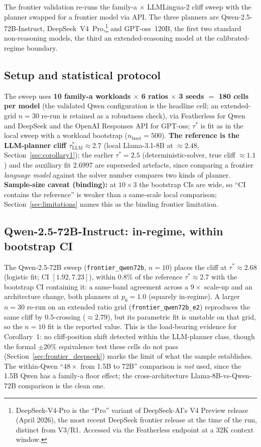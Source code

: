 The frontier validation re-runs the family-a $\times$ LLMLingua-2
cliff sweep with the planner swapped for a frontier model via API.
The three planners are Qwen-2.5-72B-Instruct,
DeepSeek~V4~Pro,\footnote{DeepSeek-V4-Pro is the ``Pro'' variant of
DeepSeek-AI's V4 Preview release (April 2026), the most recent
DeepSeek frontier release at the time of the run, distinct from
V3/R1. Accessed via the Featherless endpoint at a $32$K context
window.} and
GPT-oss~120B, the first two standard non-reasoning models, the third
an extended-reasoning model at the calibrated-regime boundary.

\subsection{Setup and statistical protocol}

The sweep uses \textbf{10 family-a workloads $\times$ 6 ratios
$\times$ 3 seeds $=$ 180 cells per model} (the validated Qwen
configuration is the headline cell; an extended-grid $n=30$ re-run is
retained as a robustness check), via Featherless for Qwen and DeepSeek
and the OpenAI Responses API for GPT-oss; $\tau^{*}$ is fit as in the
local sweep with a workload bootstrap ($n_\text{boot}=500$).
\textbf{The reference is the LLM-planner cliff
$\tau^{*}_\text{LLM}\approx2.7$} (local Llama-3.1-8B at $\approx2.48$,
Section~\ref{sec:corollary1}); the earlier $\tau^{*}=2.5$
(deterministic-solver, true cliff $\approx1.1$) and the auxiliary fit
$2.6997$ are superseded artefacts, since comparing a frontier
\emph{language model} against the solver number compares two kinds of
planner. \textbf{Sample-size caveat (binding):} at $10\times3$ the
bootstrap CIs are wide, so ``CI contains the reference'' is weaker
than a same-scale local comparison; Section~\ref{sec:limitations}
names this as the binding frontier limitation.

\subsection{Qwen-2.5-72B-Instruct: in-regime, within bootstrap CI}

The Qwen-2.5-72B sweep (\texttt{frontier\_qwen72b}, $n=10$) places the
cliff at $\tau^{*}\approx2.68$ (logistic fit; CI $[1.92,7.23]$),
within $0.8\%$ of the reference $\tau^{*}\approx2.7$ with the bootstrap
CI containing it: a same-band agreement across a $9\times$ scale-up
and an architecture change, both planners at $p_0=1.0$ (squarely
in-regime). A larger $n=30$ re-run on an extended ratio grid
(\texttt{frontier\_qwen72b\_e2}) reproduces the same cliff by
$0.5$-crossing ($\approx2.79$), but its parametric fit is unstable on
that grid, so the $n=10$ fit is the reported value. This is the
load-bearing evidence for Corollary~1: no cliff-position shift
detected within the LLM-planner class, though the formal $\pm20\%$
equivalence test these cells do not pass
(Section~\ref{sec:frontier_deepseek}) marks the limit of what the
sample establishes. The within-Qwen ``$48\times$ from 1.5B to 72B''
comparison is \emph{not} used, since the 1.5B Qwen has a family-a
floor effect; the cross-architecture Llama-8B-vs-Qwen-72B comparison
is the clean one.

